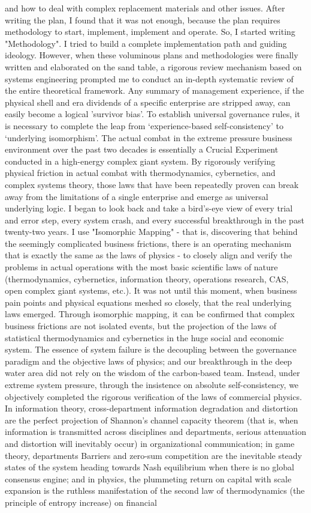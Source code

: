 \documentclass[11pt,a4paper]{article}
\begin{document}
and how to deal with complex replacement materials and other issues. After writing the plan, I found that it was not enough, because the plan requires methodology to start, implement, implement and operate. So, I started writing "Methodology". I tried to build a complete implementation path and guiding ideology. However, when these voluminous plans and methodologies were finally written and elaborated on the sand table, a rigorous review mechanism based on systems engineering prompted me to conduct an in-depth systematic review of the entire theoretical framework. Any summary of management experience, if the physical shell and era dividends of a specific enterprise are stripped away, can easily become a logical 'survivor bias'. To establish universal governance rules, it is necessary to complete the leap from ‘experience-based self-consistency’ to ‘underlying isomorphism’. The actual combat in the extreme pressure business environment over the past two decades is essentially a Crucial Experiment conducted in a high-energy complex giant system. By rigorously verifying physical friction in actual combat with thermodynamics, cybernetics, and complex systems theory, those laws that have been repeatedly proven can break away from the limitations of a single enterprise and emerge as universal underlying logic. I began to look back and take a bird's-eye view of every trial and error step, every system crash, and every successful breakthrough in the past twenty-two years. I use "Isomorphic Mapping" - that is, discovering that behind the seemingly complicated business frictions, there is an operating mechanism that is exactly the same as the laws of physics - to closely align and verify the problems in actual operations with the most basic scientific laws of nature (thermodynamics, cybernetics, information theory, operations research, CAS, open complex giant systems, etc.). It was not until this moment, when business pain points and physical equations meshed so closely, that the real underlying laws emerged. Through isomorphic mapping, it can be confirmed that complex business frictions are not isolated events, but the projection of the laws of statistical thermodynamics and cybernetics in the huge social and economic system. The essence of system failure is the decoupling between the governance paradigm and the objective laws of physics; and our breakthrough in the deep water area did not rely on the wisdom of the carbon-based team. Instead, under extreme system pressure, through the insistence on absolute self-consistency, we objectively completed the rigorous verification of the laws of commercial physics. In information theory, cross-department information degradation and distortion are the perfect projection of Shannon's channel capacity theorem (that is, when information is transmitted across disciplines and departments, serious attenuation and distortion will inevitably occur) in organizational communication; in game theory, departments Barriers and zero-sum competition are the inevitable steady states of the system heading towards Nash equilibrium when there is no global consensus engine; and in physics, the plummeting return on capital with scale expansion is the ruthless manifestation of the second law of thermodynamics (the principle of entropy increase) on financial 
\end{document}
